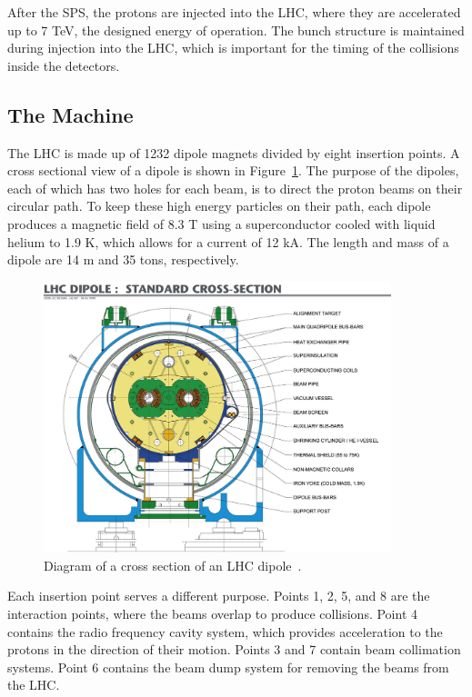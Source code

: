 After the SPS, the protons are injected into the LHC, where they are accelerated up to 7 TeV, the
designed energy of operation.
The bunch structure is maintained during injection into the LHC, which is important for the timing
of the collisions inside the detectors. 

\subsection{The Machine\label{subsec:machine}}

The LHC is made up of 1232 dipole magnets divided by eight insertion points. A cross sectional view
of a dipole is shown in Figure~\ref{fig:lhc_dipole}. The purpose of the
dipoles, each of which has two holes for each beam, is to direct the proton beams on their circular
path. To keep these high energy particles on their path, each dipole produces a magnetic field
of 8.3 T using a superconductor cooled with liquid helium to 1.9 K, which allows for a current
of 12 kA. The length and mass of a dipole are 14 m and 35 tons, respectively.

\begin{figure}[ht]
 \begin{center}
    \includegraphics[width=0.90\textwidth]{figures/experiment/9906025_01.jpeg}
      \end{center}
\caption{Diagram of a cross section of an LHC dipole~\cite{Team:40524}.}
\label{fig:lhc_dipole}
\end{figure}

Each insertion point serves a different purpose. Points 1, 2, 5, and 8 are the interaction points, where
the beams overlap to produce collisions. Point 4 contains the radio frequency cavity system, which
provides acceleration to the protons in the direction of their motion. Points 3 and 7 contain beam
collimation systems. Point 6 contains the beam dump system for removing the beams from the LHC.


